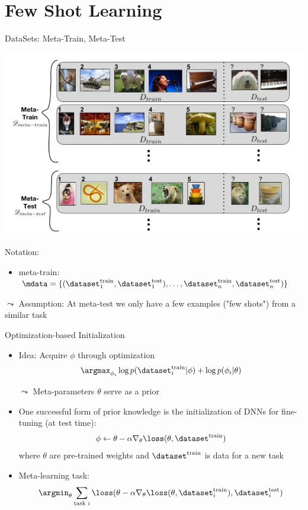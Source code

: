 \section{Few Shot Learning}
\begin{frame}[c]{DataSets: Meta-Train, Meta-Test}

\begin{center}
\includegraphics[width=.6\textwidth]{images/metalearning_datasets.png}

\end{center}
\smallskip

Notation: 
\begin{itemize}
	\item meta-train: $\mdata = \{(\dataset^{\text{train}}_1,\dataset^{\text{test}}_1), \ldots, \dataset^{\text{train}}_n,\dataset^{\text{test}}_n)  \}$
\end{itemize}


$\leadsto$ Assumption: At meta-test we only have a few examples ("few shots") from a similar task

\end{frame}
\begin{frame}[c]{Optimization-based Initialization }

\begin{itemize}
	\item Idea: Acquire $\phi$ through optimization
	$$\argmax_{\phi_i} \log p(\dataset^{\text{train}}_i | \phi) + \log p(\phi_i | \theta)$$
	\pause
	\smallskip
	\item[$\leadsto$] Meta-parameters $\theta$ serve as a prior
	\pause
	\smallskip
	\item One successful form of prior knowledge is the initialization of DNNs for fine-tuning (at test time):
	$$ \phi \leftarrow \theta - \alpha \nabla_\theta \loss(\theta, \dataset^{\text{train}})$$
	where $\theta$ are pre-trained weights and $\dataset^{\text{train}}$ is data for a new task
	\pause
	\smallskip
	\item Meta-learning task:
	$$\argmin_{\theta} \sum_{\text{task } i} \loss(\theta - \alpha \nabla_\theta \loss(\theta, \dataset_i^{\text{train}}),  \dataset_i^{\text{test}})$$
	
\end{itemize}


\end{frame}

